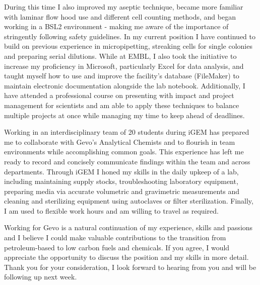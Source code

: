 \documentclass[11pt,a4paper,sans]{moderncv}
\begin{document}
\begin{spacing}{1.1}
During this time I also improved my aseptic technique, became more familiar with laminar flow hood use and different cell counting methods, and began working in a BSL2 environment - making me aware of the importance of stringently following safety guidelines. In my current position I have continued to build on previous experience in micropipetting, streaking cells for single colonies and preparing serial dilutions.  While at EMBL, I also took the initiative to increase my proficiency in Microsoft, particularly Excel for data analysis, and taught myself how to use and improve the facility's database (FileMaker) to maintain electronic documentation alongside the lab notebook. Additionally, I have attended a professional course on presenting with impact and project management for scientists and am able to apply these techniques to balance multiple projects at once while managing my time to keep ahead of deadlines.  \par\vspace*{1mm}
 
Working in an interdisciplinary team of 20 students during iGEM has prepared me to collaborate with Gevo's Analytical Chemists and to flourish in team environments while accomplishing common goals. This experience has left me ready to record and concisely communicate findings within the team and across departments. Through iGEM I honed my skills in the daily upkeep of a lab, including maintaining supply stocks, troubleshooting laboratory equipment, preparing media via accurate volumetric and gravimetric measurements and cleaning and sterilizing equipment using autoclaves or filter sterilization. Finally, I am used to flexible work hours and am willing to travel as required. \par\vspace*{1mm}

Working for Gevo is a natural continuation of my experience, skills and passions and I believe I could make valuable contributions to the transition from petroleum-based to low carbon fuels and chemicals. If you agree, I would appreciate the opportunity to discuss the position and my skills in more detail. Thank you for your consideration, I look forward to hearing from you and will be following up next week.

\end{spacing}
\vspace*{2mm} 
\makeletterclosing
\end{document}
